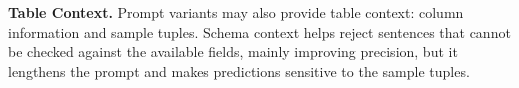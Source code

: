 


\smallskip\noindent\textbf{Table Context.}
Prompt variants may also provide table context: column information and sample tuples. Schema context helps reject sentences that cannot be checked against the available fields, mainly improving precision, but it lengthens the prompt and makes predictions sensitive to the sample tuples.












%
%
%
%
%
